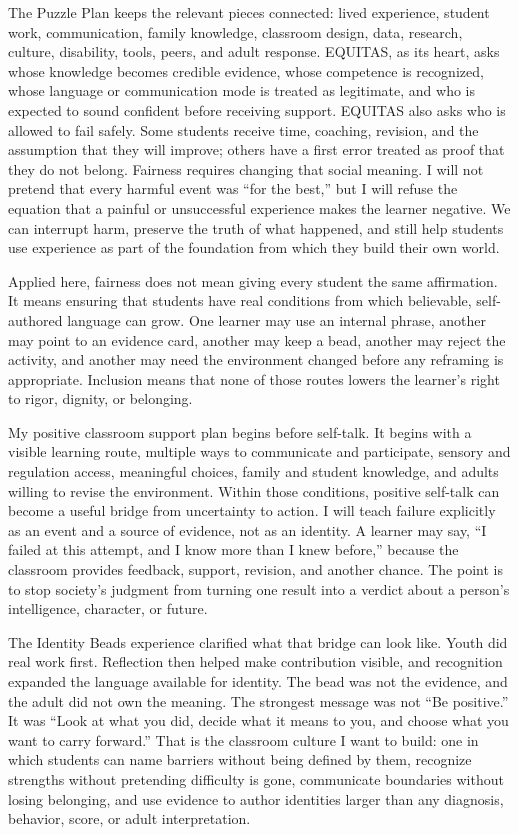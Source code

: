 \documentclass[11pt]{article}
\newcommand{\reviewsection}[1]{%
  \Needspace{4\baselineskip}
  \vspace{0.08in}\noindent{\normalsize\bfseries\color{PrimaryRed}#1}
  \par\vspace{0.025in}
}
\begin{document}
The Puzzle Plan keeps the relevant pieces connected: lived experience, student work, communication, family knowledge, classroom design, data, research, culture, disability, tools, peers, and adult response. EQUITAS, as its heart, asks whose knowledge becomes credible evidence, whose competence is recognized, whose language or communication mode is treated as legitimate, and who is expected to sound confident before receiving support. EQUITAS also asks who is allowed to fail safely. Some students receive time, coaching, revision, and the assumption that they will improve; others have a first error treated as proof that they do not belong. Fairness requires changing that social meaning. I will not pretend that every harmful event was ``for the best,'' but I will refuse the equation that a painful or unsuccessful experience makes the learner negative. We can interrupt harm, preserve the truth of what happened, and still help students use experience as part of the foundation from which they build their own world.

Applied here, fairness does not mean giving every student the same affirmation. It means ensuring that students have real conditions from which believable, self-authored language can grow. One learner may use an internal phrase, another may point to an evidence card, another may keep a bead, another may reject the activity, and another may need the environment changed before any reframing is appropriate. Inclusion means that none of those routes lowers the learner's right to rigor, dignity, or belonging.

\reviewsection{Conclusion}

My positive classroom support plan begins before self-talk. It begins with a visible learning route, multiple ways to communicate and participate, sensory and regulation access, meaningful choices, family and student knowledge, and adults willing to revise the environment. Within those conditions, positive self-talk can become a useful bridge from uncertainty to action. I will teach failure explicitly as an event and a source of evidence, not as an identity. A learner may say, ``I failed at this attempt, and I know more than I knew before,'' because the classroom provides feedback, support, revision, and another chance. The point is to stop society's judgment from turning one result into a verdict about a person's intelligence, character, or future.

The Identity Beads experience clarified what that bridge can look like. Youth did real work first. Reflection then helped make contribution visible, and recognition expanded the language available for identity. The bead was not the evidence, and the adult did not own the meaning. The strongest message was not ``Be positive.'' It was ``Look at what you did, decide what it means to you, and choose what you want to carry forward.'' That is the classroom culture I want to build: one in which students can name barriers without being defined by them, recognize strengths without pretending difficulty is gone, communicate boundaries without losing belonging, and use evidence to author identities larger than any diagnosis, behavior, score, or adult interpretation.

\newpage

\end{document}
